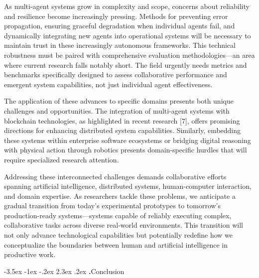 \documentclass[journal,twoside,10pt]{IEEEtran}
\makeatletter
\renewcommand\section{\@startsection{section}{1}{\z@}%
                       {-3.5ex \@plus -1ex \@minus -.2ex}%
                       {2.3ex \@plus.2ex}%
                       {\normalfont\Large\bfseries\Roman{section}.\quad}}
\makeatother
\begin{document}
As multi-agent systems grow in complexity and scope, concerns about reliability and resilience become increasingly pressing. Methods for preventing error propagation, ensuring graceful degradation when individual agents fail, and dynamically integrating new agents into operational systems will be necessary to maintain trust in these increasingly autonomous frameworks. This technical robustness must be paired with comprehensive evaluation methodologies—an area where current research falls notably short. The field urgently needs metrics and benchmarks specifically designed to assess collaborative performance and emergent system capabilities, not just individual agent effectiveness.

The application of these advances to specific domains presents both unique challenges and opportunities. The integration of multi-agent systems with blockchain technologies, as highlighted in recent research [7], offers promising directions for enhancing distributed system capabilities. Similarly, embedding these systems within enterprise software ecosystems or bridging digital reasoning with physical action through robotics presents domain-specific hurdles that will require specialized research attention.

Addressing these interconnected challenges demands collaborative efforts spanning artificial intelligence, distributed systems, human-computer interaction, and domain expertise. As researchers tackle these problems, we anticipate a gradual transition from today's experimental prototypes to tomorrow's production-ready systems—systems capable of reliably executing complex, collaborative tasks across diverse real-world environments. This transition will not only advance technological capabilities but potentially redefine how we conceptualize the boundaries between human and artificial intelligence in productive work.

\section{Conclusion}
\end{document}
